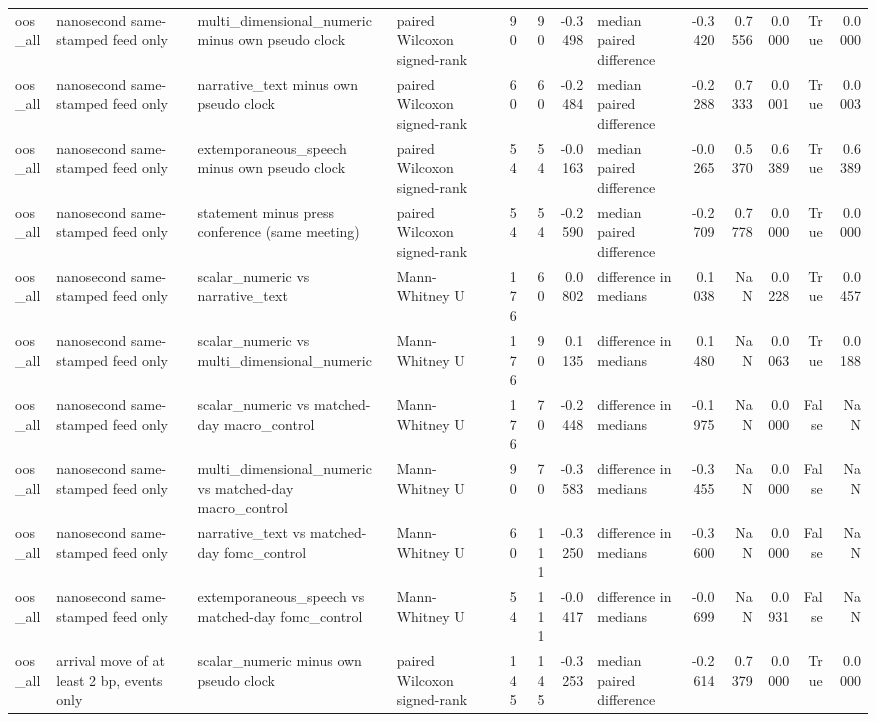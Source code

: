 \begin{tabular}{llllrrrlrrrrr}
oos_all & nanosecond same-stamped feed only & multi_dimensional_numeric minus own pseudo clock & paired Wilcoxon signed-rank & 90 & 90 & -0.3498 & median paired difference & -0.3420 & 0.7556 & 0.0000 & True & 0.0000 \\
oos_all & nanosecond same-stamped feed only & narrative_text minus own pseudo clock & paired Wilcoxon signed-rank & 60 & 60 & -0.2484 & median paired difference & -0.2288 & 0.7333 & 0.0001 & True & 0.0003 \\
oos_all & nanosecond same-stamped feed only & extemporaneous_speech minus own pseudo clock & paired Wilcoxon signed-rank & 54 & 54 & -0.0163 & median paired difference & -0.0265 & 0.5370 & 0.6389 & True & 0.6389 \\
oos_all & nanosecond same-stamped feed only & statement minus press conference (same meeting) & paired Wilcoxon signed-rank & 54 & 54 & -0.2590 & median paired difference & -0.2709 & 0.7778 & 0.0000 & True & 0.0000 \\
oos_all & nanosecond same-stamped feed only & scalar_numeric vs narrative_text & Mann-Whitney U & 176 & 60 & 0.0802 & difference in medians & 0.1038 & NaN & 0.0228 & True & 0.0457 \\
oos_all & nanosecond same-stamped feed only & scalar_numeric vs multi_dimensional_numeric & Mann-Whitney U & 176 & 90 & 0.1135 & difference in medians & 0.1480 & NaN & 0.0063 & True & 0.0188 \\
oos_all & nanosecond same-stamped feed only & scalar_numeric vs matched-day macro_control & Mann-Whitney U & 176 & 70 & -0.2448 & difference in medians & -0.1975 & NaN & 0.0000 & False & NaN \\
oos_all & nanosecond same-stamped feed only & multi_dimensional_numeric vs matched-day macro_control & Mann-Whitney U & 90 & 70 & -0.3583 & difference in medians & -0.3455 & NaN & 0.0000 & False & NaN \\
oos_all & nanosecond same-stamped feed only & narrative_text vs matched-day fomc_control & Mann-Whitney U & 60 & 111 & -0.3250 & difference in medians & -0.3600 & NaN & 0.0000 & False & NaN \\
oos_all & nanosecond same-stamped feed only & extemporaneous_speech vs matched-day fomc_control & Mann-Whitney U & 54 & 111 & -0.0417 & difference in medians & -0.0699 & NaN & 0.0931 & False & NaN \\
oos_all & arrival move of at least 2 bp, events only & scalar_numeric minus own pseudo clock & paired Wilcoxon signed-rank & 145 & 145 & -0.3253 & median paired difference & -0.2614 & 0.7379 & 0.0000 & True & 0.0000 \\

\end{tabular}
